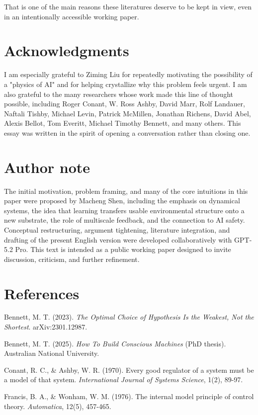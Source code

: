 \documentclass[11pt]{article}
\begin{document}
That is one of the main reasons these literatures deserve to be kept in view, even in an intentionally accessible working paper.

\section*{Acknowledgments}

I am especially grateful to Ziming Liu for repeatedly motivating the possibility of a "physics of AI" and for helping crystallize why this problem feels urgent. I am also grateful to the many researchers whose work made this line of thought possible, including Roger Conant, W. Ross Ashby, David Marr, Rolf Landauer, Naftali Tishby, Michael Levin, Patrick McMillen, Jonathan Richens, David Abel, Alexis Bellot, Tom Everitt, Michael Timothy Bennett, and many others. This essay was written in the spirit of opening a conversation rather than closing one.

\section*{Author note}

The initial motivation, problem framing, and many of the core intuitions in this paper were proposed by Macheng Shen, including the emphasis on dynamical systems, the idea that learning transfers usable environmental structure onto a new substrate, the role of multiscale feedback, and the connection to AI safety. Conceptual restructuring, argument tightening, literature integration, and drafting of the present English version were developed collaboratively with GPT-5.2 Pro. This text is intended as a public working paper designed to invite discussion, criticism, and further refinement.

\section*{References}

Bennett, M. T. (2023). \textit{The Optimal Choice of Hypothesis Is the Weakest, Not the Shortest}. arXiv:2301.12987.

Bennett, M. T. (2025). \textit{How To Build Conscious Machines} (PhD thesis). Australian National University.

Conant, R. C., \& Ashby, W. R. (1970). Every good regulator of a system must be a model of that system. \textit{International Journal of Systems Science}, 1(2), 89-97.

Francis, B. A., \& Wonham, W. M. (1976). The internal model principle of control theory. \textit{Automatica}, 12(5), 457-465.
\end{document}
